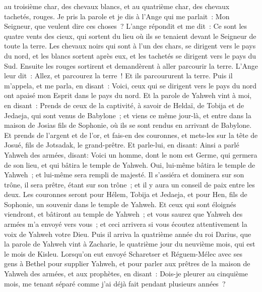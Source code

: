 \begin{multicols}{2}
au troisième char, des chevaux blancs, et au quatrième char, des chevaux tachetés, rouges.
Je pris la parole et je dis à l'Ange qui me parlait~: Mon Seigneur, que veulent dire ces choses~?
L'ange répondit et me dit~: Ce sont les quatre vents des cieux, qui sortent du lieu où ils se tenaient devant le Seigneur de toute la terre.
Les chevaux noirs qui sont à l'un des chars, se dirigent vers le pays du nord, et les blancs sortent après eux, et les tachetés se dirigent vers le pays du Sud.
Ensuite les rouges sortirent et demandèrent à aller parcourir la terre. L'Ange leur dit~: Allez, et parcourez la terre~! Et ils parcoururent la terre.
Puis il m'appela, et me parla, en disant~: Voici, ceux qui se dirigent vers le pays du nord ont apaisé mon Esprit dans le pays du nord.
Et la parole de Yahweh vint à moi, en disant~:
Prends de ceux de la captivité, à savoir de Heldaï, de Tobija et de Jedaeja, qui sont venus de Babylone~; et viens ce même jour-là, et entre dans la maison de Josias fils de Sophonie, où ils se sont rendus en arrivant de Babylone.
Et prends de l'argent et de l'or, et fais-en des couronnes, et mets-les sur la tête de Josué, fils de Jotsadak, le grand-prêtre.
Et parle-lui, en disant: Ainsi a parlé Yahweh des armées, disant: Voici un homme, dont le nom est Germe, qui germera de son lieu, et qui bâtira le temple de Yahweh.
Oui, lui-même bâtira le temple de Yahweh~; et lui-même sera rempli de majesté. Il s'assiéra et dominera sur son trône, il sera prêtre, étant sur son trône~; et il y aura un conseil de paix entre les deux.
Les couronnes seront pour Hélem, Tobija et Jedaeja, et pour Hen, fils de Sophonie, un souvenir dans le temple de Yahweh.
 Et ceux qui sont éloignés viendront, et bâtiront au temple de Yahweh~; et vous saurez que Yahweh des armées m'a envoyé vers vous~; et ceci arrivera si vous écoutez attentivement la voix de Yahweh votre Dieu.
\VerseOne{}Puis il arriva la quatrième année du roi Darius, que la parole de Yahweh vint à Zacharie, le quatrième jour du neuvième mois, qui est le mois de Kisleu.
Lorsqu'on eut envoyé Scharetser et Réguem-Mélec avec ses gens à Bethel pour supplier Yahweh,
et pour parler aux prêtres de la maison de Yahweh des armées, et aux prophètes, en disant~: Dois-je pleurer au cinquième mois, me tenant séparé comme j'ai déjà fait pendant plusieurs années~?

\end{multicols}
